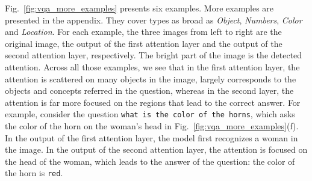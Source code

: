 \documentclass[10pt,twocolumn,letterpaper]{article}
\begin{document}
Fig.~\ref{fig:vqa_more_examples} presents six examples. More examples are
presented in the appendix. They cover types as broad as \emph{Object},
\emph{Numbers}, \emph{Color} and \emph{Location}. For each example, the three
images from left to right are the original image, the output of the first
attention layer and the output of the second attention layer, respectively. The
bright part of the image is the detected attention. Across all those examples,
we see that in the first attention layer, the attention is scattered on many
objects in the image, largely corresponds to the objects and concepts referred
in the question, whereas in the second layer, the attention is far more focused
on the regions that lead to the correct answer. For example, consider the
question \texttt{what is the color of the horns}, which asks the color of the
horn on the woman's head in Fig.~\ref{fig:vqa_more_examples}(f). In the output
of the first attention layer, the model first recognizes a woman in the
image. In the output of the second attention layer, the attention is focused on
the head of the woman, which leads to the answer of the question: the color of
the horn is \texttt{red}.
\end{document}
